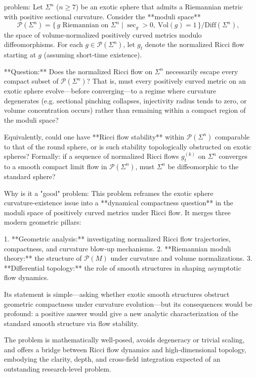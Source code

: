 problem:  
Let $\Sigma^n$ ($n\ge7$) be an exotic sphere that admits a Riemannian metric with positive sectional curvature. Consider the **moduli space**  
\[
\mathcal{P}(\Sigma^n) = \{\, g \text{ Riemannian on }\Sigma^n \mid \sec_g>0,\ \mathrm{Vol}(g)=1 \,\}/\mathrm{Diff}(\Sigma^n),
\]  
the space of volume‑normalized positively curved metrics modulo diffeomorphisms.  
For each $g\in\mathcal{P}(\Sigma^n)$, let $g_t$ denote the normalized Ricci flow starting at $g$ (assuming short‑time existence).  

**Question:**  
Does the normalized Ricci flow on $\Sigma^n$ necessarily escape every compact subset of $\mathcal{P}(\Sigma^n)$?  
That is, must every positively curved metric on an exotic sphere evolve—before converging—to a regime where curvature degenerates (e.g. sectional pinching collapses, injectivity radius tends to zero, or volume concentration occurs) rather than remaining within a compact region of the moduli space?  

Equivalently, could one have **Ricci flow stability** within $\mathcal{P}(\Sigma^n)$ comparable to that of the round sphere, or is such stability topologically obstructed on exotic spheres?  
Formally: if a sequence of normalized Ricci flows $g_t^{(k)}$ on $\Sigma^n$ converges to a smooth compact limit flow in $\mathcal{P}(\Sigma^n)$, must $\Sigma^n$ be diffeomorphic to the standard sphere?  

Why is it a "good" problem:  
This problem reframes the exotic sphere curvature‑existence issue into a **dynamical compactness question** in the moduli space of positively curved metrics under Ricci flow.  
It merges three modern geometric pillars:  

1. **Geometric analysis:** investigating normalized Ricci flow trajectories, compactness, and curvature blow‑up mechanisms.  
2. **Riemannian moduli theory:** the structure of $\mathcal{P}(M)$ under curvature and volume normalizations.  
3. **Differential topology:** the role of smooth structures in shaping asymptotic flow dynamics.  

Its statement is simple—asking whether exotic smooth structures obstruct geometric compactness under curvature evolution—but its consequences would be profound: a positive answer would give a new analytic characterization of the standard smooth structure via flow stability.  

The problem is mathematically well‑posed, avoids degeneracy or trivial scaling, and offers a bridge between Ricci flow dynamics and high‑dimensional topology, embodying the clarity, depth, and cross‑field integration expected of an outstanding research‑level problem.